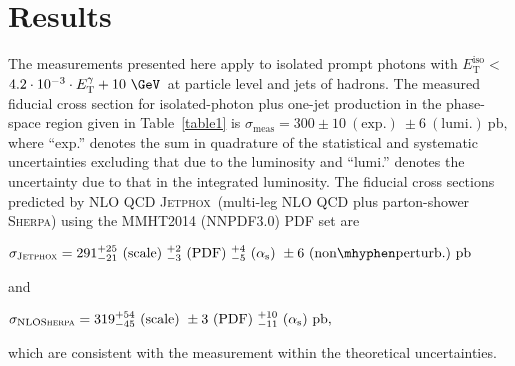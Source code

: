 \documentclass[cernpreprint,texlive=2016,txfonts,UKenglish]{latex/atlasdoc}
\def\etg{E_{\mathrm{T}}^{\gamma}}
\def\etiso{E_{\mathrm{T}}^{\mathrm{iso}}}
\def\etisocutp{$4.2\cdot 10^{-3}\cdot \etg +10\ {\mathrm{\GeV}}$}
\def\sher{{\textsc{Sherpa}}}
\def\jetp{{\textsc{Jetphox}}}
\begin{document}
\section{Results}
\label{res}
The measurements presented here apply to isolated prompt photons with
$\etiso<$~\etisocutp\ at particle level and jets of hadrons. The
measured fiducial cross section for isolated-photon plus one-jet
production in the phase-space region given in Table~\ref{table1} is 
$\sigma_{\mathrm{meas}} = 300 \pm 10\ ({\mathrm{exp.}})\ \pm 6\ ({\mathrm{lumi.}})\ {\mathrm{pb}},$
where ``exp.'' denotes the sum in quadrature of the statistical and
systematic uncertainties excluding that due to the luminosity and
``lumi.'' denotes the uncertainty due to that in the integrated
luminosity. The fiducial cross sections predicted by NLO QCD \jetp\
(multi-leg NLO QCD plus parton-shower \sher) using the MMHT2014
(NNPDF3.0) PDF set are

\vspace{0.25cm}
\centerline{$\sigma_{\mathrm{\jetp}}=291_{-21}^{+25}\ ({\mathrm{scale}})\  _{-3}^{+2}\ ({\mathrm{PDF}})\ _{-5}^{+4} \ ({\mathrm{\alpha_{\mathrm{s}}}})\ \pm 6 \ ({\mathrm{non\mhyphen perturb.}})\ {\mathrm {pb}}$}

and

\centerline{$\sigma_{\mathrm{NLO \sher}}=319_{-45}^{+54}\ ({\mathrm{scale}})\ \pm 3\ ({\mathrm{PDF}})\ _{-11}^{+10} \ ({\mathrm{\alpha_{\mathrm{s}}}})\ {\mathrm {pb}},$}
which are consistent with the measurement within the theoretical uncertainties.
\end{document}
